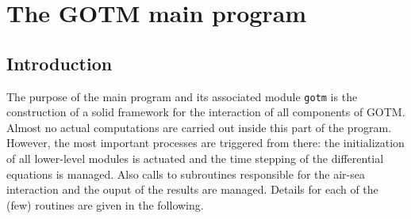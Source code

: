 %
%

\section{The GOTM main program \label{sec:mainIntro}}

\subsection{Introduction}
The purpose of the main program and its associated module {\tt gotm}
is the construction of a solid framework for the interaction of all
components of GOTM. Almost no actual computations are carried out
inside this part of the program. However, the most important processes
are triggered from there: the initialization of all lower-level modules 
is actuated and the time stepping of the differential equations is managed.
Also calls to subroutines responsible for the air-sea interaction and
the ouput of the results are managed. Details for each of the (few) routines
are given in the following.

